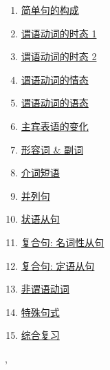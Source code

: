 \documentclass[11pt]{article}
\renewcommand{\today}{\shortmonthname[\the\month] \the \day,  \the\year}
\begin{document}
\begin{multicols}{3}
	\begin{enumerate}
		\item \href{https://mp.weixin.qq.com/s/qDMbkQsr5bNUPEfMgHOjgw}{简单句的构成}	%
		\item \href{https://mp.weixin.qq.com/s/DaDDNXwCRAIILUjYk8ZP7A}{谓语动词的时态 1}	%
		\item \href{https://mp.weixin.qq.com/s/T_WO5eWDEIb9FpvdG7vUrQ}{谓语动词的时态 2}	%
		\item \href{https://mp.weixin.qq.com/s/xNJUme3ysBfnLL1CoyJFOQ}{谓语动词的情态}	%
		\item \href{https://mp.weixin.qq.com/s/c05jQcY6xJv58OK3slAmog}{谓语动词的语态}	%
		\item \href{https://mp.weixin.qq.com/s/0A_RxD5Rr-_QrWrPFWTW6g}{主宾表语的变化}	%
		\item \href{https://mp.weixin.qq.com/s/hzDqW-BB-qXTJSJFtqEWGg}{形容词 \& 副词}	%
		\item \href{https://mp.weixin.qq.com/s/BjLwmtEHF1EvPVod7WCTCg}{介词短语}	%
		\item \href{https://mp.weixin.qq.com/s/HKbTmsViBXRCMvLpGdmT7A}{并列句}	%
		\item \href{https://mp.weixin.qq.com/s/N2PGLoLrSUlWFmn9H-eszA}{状语从句}	%
		\item \href{https://mp.weixin.qq.com/s/KuXtBginHFPw7fvievawSA}{复合句: 名词性从句}	%
		\item \href{https://mp.weixin.qq.com/s/rJE22G0PLh-xhhNGqk_MoQ}{复合句: 定语从句}	%
		\item \href{https://mp.weixin.qq.com/s/CmfK73KX5eVERanjgR41KA}{非谓语动词}	%
		\item \href{https://mp.weixin.qq.com/s/sEPYLToVKLQcdBu9_9OSpw}{特殊句式}	%
		\item \href{https://mp.weixin.qq.com/s/05Hx5hKvLni5IWiwgKVxXw}{综合复习}	%
	\end{enumerate}
\end{multicols}







%
\begin{flushright}
	\tiny \today 
\end{flushright}
\end{document}
